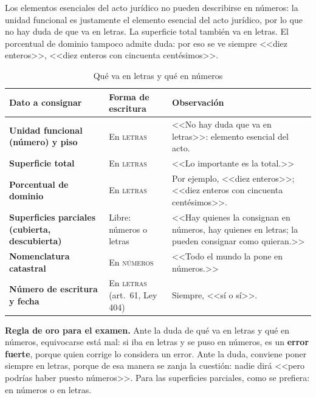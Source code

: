 \documentclass[12pt,oneside]{book}
\begin{document}
Los elementos esenciales del acto jurídico no pueden describirse en números: la unidad funcional es justamente el elemento esencial del acto jurídico, por lo que no hay duda de que va en letras. La superficie total también va en letras. El porcentual de dominio tampoco admite duda: por eso se ve siempre <<diez enteros>>, <<diez enteros con cincuenta centésimos>>.

\begin{table}[H]
\centering
\caption{Qué va en letras y qué en números}
\small
\begin{tabularx}{\textwidth}{>{\RaggedRight\arraybackslash}p{4cm} >{\RaggedRight\arraybackslash}p{2.9cm} >{\RaggedRight\arraybackslash}X}
\toprule
\textbf{Dato a consignar} & \textbf{Forma de escritura} & \textbf{Observación} \\
\midrule
\textbf{Unidad funcional (número) y piso} & En \textsc{letras} & <<No hay duda que va en letras>>: elemento esencial del acto. \\
\addlinespace
\textbf{Superficie total} & En \textsc{letras} & <<Lo importante es la total.>> \\
\addlinespace
\textbf{Porcentual de dominio} & En \textsc{letras} & Por ejemplo, <<diez enteros>>; <<diez enteros con cincuenta centésimos>>. \\
\addlinespace
\textbf{Superficies parciales (cubierta, descubierta)} & Libre: números o letras & <<Hay quienes la consignan en números, hay quienes en letras; la pueden consignar como quieran.>> \\
\addlinespace
\textbf{Nomenclatura catastral} & En \textsc{números} & <<Todo el mundo la pone en números.>> \\
\addlinespace
\textbf{Número de escritura y fecha} & En \textsc{letras} (art.~61, Ley 404) & Siempre, <<sí o sí>>. \\
\bottomrule
\end{tabularx}
\end{table}

\begin{important}
\textbf{Regla de oro para el examen.} Ante la duda de qué va en letras y qué en números, equivocarse está mal: si iba en letras y se puso en números, es un \textbf{error fuerte}, porque quien corrige lo considera un error. Ante la duda, conviene poner siempre en letras, porque de esa manera se zanja la cuestión: nadie dirá <<pero podrías haber puesto números>>. Para las superficies parciales, como se prefiera: en números o en letras.
\end{important}
\end{document}
